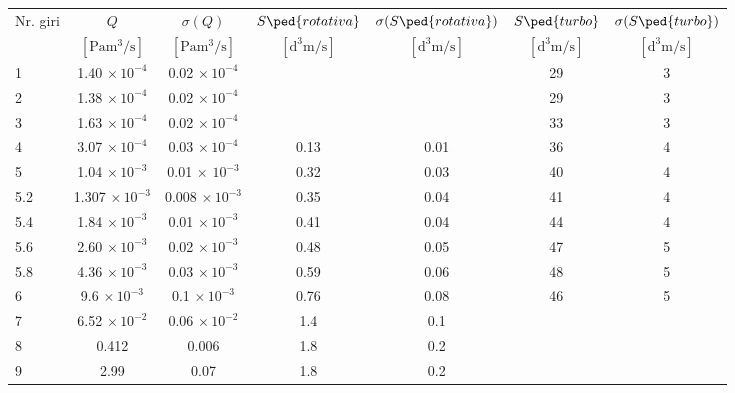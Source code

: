 \begin{table}
    \begin{tabular}{l c c c c c c}
        \toprule
        Nr. giri & $Q$ & $\sigma (Q)$ & $S\ped{rotativa}$ & $\sigma (S\ped{rotativa})$ & $S\ped{turbo}$ & $\sigma (S\ped{turbo})$ \\

        & $[\si{\Pa\cubic\meter\per\second}]$ & $[\si{\Pa\cubic\meter\per\second}]$ &
        $[\si{\cubic\deci\meter\per\second}]$ & $[\si{\cubic\deci\meter\per\second}]$ &
        $[\si{\cubic\deci\meter\per\second}]$ & $[\si{\cubic\deci\meter\per\second}]$ \\

        \midrule
        1   & 1.40  $\times \, 10^{-4}$ & 0.02 $\times \, 10^{-4}$    &      &      & 29 & 3 \\
        2   & 1.38  $\times \, 10^{-4}$ & 0.02 $\times \, 10^{-4}$    &      &      & 29 & 3 \\
        3   & 1.63  $\times \, 10^{-4}$ & 0.02 $\times \, 10^{-4}$    &      &      & 33 & 3 \\
        4   & 3.07  $\times \, 10^{-4}$ & 0.03 $\times \, 10^{-4}$    & 0.13 & 0.01 & 36 & 4 \\
        5   & 1.04  $\times \, 10^{-3}$ & 0.01 $\times \, \, 10^{-3}$ & 0.32 & 0.03 & 40 & 4 \\
        5.2 & 1.307 $\times \, 10^{-3}$ & 0.008 $\times \, 10^{-3}$   & 0.35 & 0.04 & 41 & 4 \\
        5.4 & 1.84  $\times \, 10^{-3}$ & 0.01 $\times \, 10^{-3}$    & 0.41 & 0.04 & 44 & 4 \\
        5.6 & 2.60  $\times \, 10^{-3}$ & 0.02 $\times \, 10^{-3}$    & 0.48 & 0.05 & 47 & 5 \\
        5.8 & 4.36  $\times \, 10^{-3}$ & 0.03 $\times \, 10^{-3}$    & 0.59 & 0.06 & 48 & 5 \\
        6   & 9.6   $\times \, 10^{-3}$ & 0.1 $\times \, 10^{-3}$     & 0.76 & 0.08 & 46 & 5 \\
        7   & 6.52  $\times \, 10^{-2}$ & 0.06 $\times \, 10^{-2}$    & 1.4  & 0.1  &    &   \\
        8   & 0.412                     & 0.006                       & 1.8  & 0.2  &    &   \\
        9   & 2.99                      & 0.07                        & 1.8  & 0.2  &    &   \\
        \bottomrule
    \end{tabular}
\end{table}
